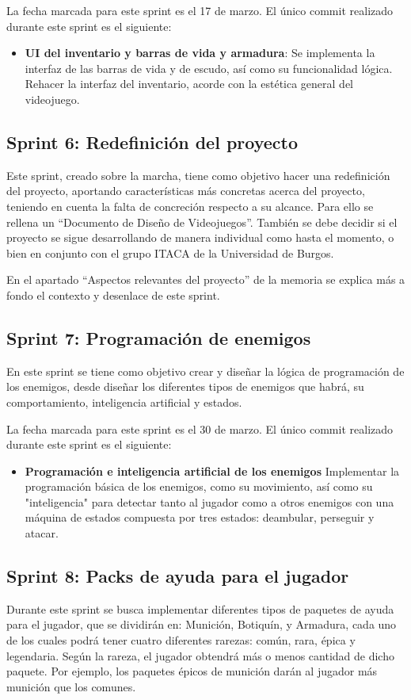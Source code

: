 La fecha marcada para este sprint es el 17 de marzo. El único commit realizado durante este sprint es el siguiente:
\begin{itemize}
    \item \textbf{UI del inventario y barras de vida y armadura}: Se implementa la interfaz de las barras de vida y de escudo, así como su funcionalidad lógica. Rehacer la interfaz del inventario, acorde con la estética general del videojuego.
\end{itemize}
\subsection{Sprint 6: Redefinición del proyecto}
Este sprint, creado sobre la marcha, tiene como objetivo hacer una redefinición del proyecto, aportando características más concretas acerca del proyecto, teniendo en cuenta la falta de concreción respecto a su alcance. Para ello se rellena un “Documento de Diseño de Videojuegos”. También se debe decidir si el proyecto se sigue desarrollando de manera individual como hasta el momento, o bien en conjunto con el grupo ITACA de la Universidad de Burgos. 

En el apartado ``Aspectos relevantes del proyecto'' de la memoria se explica más a fondo el contexto y desenlace de este sprint.
\subsection{Sprint 7: Programación de enemigos}
En este sprint se tiene como objetivo crear y diseñar la lógica de programación de los enemigos, desde diseñar los diferentes tipos de enemigos que habrá, su comportamiento, inteligencia artificial y estados.

La fecha marcada para este sprint es el 30 de marzo. El único commit realizado durante este sprint es el siguiente:
\begin{itemize}
    \item \textbf{Programación e inteligencia artificial de los enemigos} Implementar la programación básica de los enemigos, como su movimiento, así como su "inteligencia" para detectar tanto al jugador como a otros enemigos con una máquina de estados compuesta por tres estados: deambular, perseguir y atacar.
\end{itemize}
\subsection{Sprint 8: Packs de ayuda para el jugador}
Durante este sprint se busca implementar diferentes tipos de paquetes de ayuda para el jugador, que se dividirán en: Munición, Botiquín, y Armadura, cada uno de los cuales podrá tener cuatro diferentes rarezas: común, rara, épica y legendaria. Según la rareza, el jugador obtendrá más o menos cantidad de dicho paquete. Por ejemplo, los paquetes épicos de munición darán al jugador más munición que los comunes.

